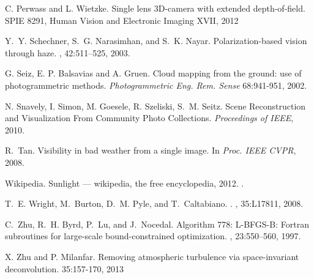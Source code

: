 \documentclass[10pt,twocolumn,letterpaper]{article}
\begin{document}
{\begin{thebibliography}{10}
C. Perwass and L. Wietzke.
\newblock Single lens 3D-camera with extended depth-of-field.
\newblock SPIE 8291, Human Vision and Electronic Imaging XVII, 2012

Y.~Y. Schechner, S.~G. Narasimhan, and S.~K. Nayar.
\newblock Polarization-based vision through haze.
, 42:511--525, 2003.

G. Seiz, E. P. Balsavias and A. Gruen.
Cloud mapping from the ground: use of photogrammetric methods.
 {\em Photogrammetric Eng. Rem. Sense} 68:941-951, 2002.

\newblock N. Snavely, I. Simon, M. Goesele, R. Szeliski, S.~M. Seitz.
\newblock Scene Reconstruction and Visualization From Community Photo Collections.
{\em Proceedings of IEEE}, 2010.

R.~Tan.
\newblock Visibility in bad weather from a single image.
\newblock In {\em Proc. IEEE CVPR}, 2008.

Wikipedia.
\newblock Sunlight --- wikipedia{,} the free encyclopedia, 2012.
.

T.~E. Wright, M.~Burton, D.~M. Pyle, and T.~Caltabiano.
.
, 35:L17811, 2008.

C.~Zhu, R.~H. Byrd, P.~Lu, and J.~Nocedal.
\newblock Algorithm 778: L-BFGS-B: Fortran subroutines for large-scale
  bound-constrained optimization.
, 23:550--560, 1997.

X. Zhu and P. Milanfar.
\newblock Removing atmospheric turbulence via space-invariant deconvolution.
 35:157-170, 2013

\end{thebibliography}

}
\end{document}
